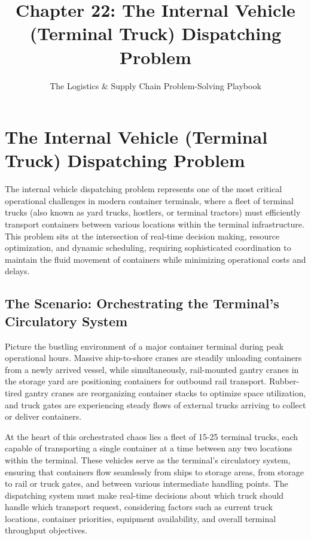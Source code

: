 \documentclass{article}
\title{Chapter 22: The Internal Vehicle (Terminal Truck) Dispatching Problem}
\author{The Logistics \& Supply Chain Problem-Solving Playbook}
\date{}
\begin{document}
\maketitle

\section{The Internal Vehicle (Terminal Truck) Dispatching Problem}

The internal vehicle dispatching problem represents one of the most critical operational challenges in modern container terminals, where a fleet of terminal trucks (also known as yard trucks, hostlers, or terminal tractors) must efficiently transport containers between various locations within the terminal infrastructure. This problem sits at the intersection of real-time decision making, resource optimization, and dynamic scheduling, requiring sophisticated coordination to maintain the fluid movement of containers while minimizing operational costs and delays.

\subsection{The Scenario: Orchestrating the Terminal's Circulatory System}

Picture the bustling environment of a major container terminal during peak operational hours. Massive ship-to-shore cranes are steadily unloading containers from a newly arrived vessel, while simultaneously, rail-mounted gantry cranes in the storage yard are positioning containers for outbound rail transport. Rubber-tired gantry cranes are reorganizing container stacks to optimize space utilization, and truck gates are experiencing steady flows of external trucks arriving to collect or deliver containers.

At the heart of this orchestrated chaos lies a fleet of 15-25 terminal trucks, each capable of transporting a single container at a time between any two locations within the terminal. These vehicles serve as the terminal's circulatory system, ensuring that containers flow seamlessly from ships to storage areas, from storage to rail or truck gates, and between various intermediate handling points. The dispatching system must make real-time decisions about which truck should handle which transport request, considering factors such as current truck locations, container priorities, equipment availability, and overall terminal throughput objectives.
\end{document}
